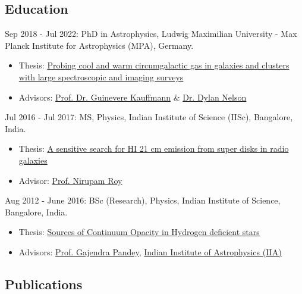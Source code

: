 \documentclass[12pt,letterpaper]{article}
\begin{document}
\subsection{Education}
\begin{list}{}{\cvlist}
  \item Sep 2018 - Jul 2022: PhD in Astrophysics, Ludwig Maximilian University - Max Planck Institute for Astrophysics (MPA), Germany.
\begin{itemize}
    \item Thesis: \href{https://edoc.ub.uni-muenchen.de/30337/}{Probing cool and warm circumgalactic gas in galaxies and clusters with large spectroscopic and imaging surveys}
    \item Advisors: \href{https://www.mpa-garching.mpg.de/galaxyformation}{Prof. Dr. Guinevere Kauffmann} \& \href{https://www.ita.uni-heidelberg.de/~dnelson/}{Dr. Dylan Nelson}
\end{itemize}

\item Jul 2016 - Jul 2017: MS, Physics, Indian Institute of Science (IISc), Bangalore, India.
\begin{itemize}
    \item Thesis: \href{https://raw.githubusercontent.com/abhi0395/mycv/main/files/MS_thesis.pdf}{A sensitive search for HI 21 cm emission from super disks in radio galaxies}
    \item Advisor: \href{http://www.physics.iisc.ernet.in/%7Enroy/}{Prof. Nirupam Roy}
  \end{itemize}
\item Aug 2012 - June 2016: BSc (Research), Physics, Indian Institute of Science, Bangalore, India.
\begin{itemize}
    \item Thesis: \href{https://raw.githubusercontent.com/abhi0395/mycv/main/files/BS_thesis.pdf}{Sources of Continuum Opacity in Hydrogen deficient stars}
    \item Advisors: \href{https://www.iiap.res.in/?q=user/29}{Prof. Gajendra Pandey}, \href{https://www.iiap.res.in/}{Indian Institute of Astrophysics (IIA)}
  \end{itemize}
\end{list}

\ifdefined\withpubs
  \subsection{Publications}
  
\end{document}
